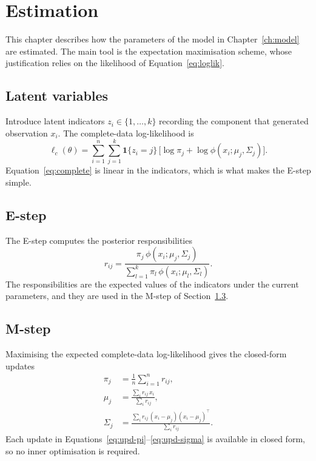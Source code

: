 \chapter{Estimation}\label{ch:estimation}

This chapter describes how the parameters of the model in
Chapter~\ref{ch:model} are estimated. The main tool is the expectation
maximisation scheme, whose justification relies on the likelihood of
Equation~\eqref{eq:loglik}.

\section{Latent variables}\label{sec:latent}

Introduce latent indicators $z_i \in \{1,\dots,k\}$ recording the component
that generated observation $x_i$. The complete-data log-likelihood is
\begin{equation}\label{eq:complete}
  \ell_c(\theta) = \sum_{i=1}^{n}\sum_{j=1}^{k} \mathbf{1}\{z_i=j\}\,
  \bigl[\log \pi_j + \log \phi(x_i;\mu_j,\Sigma_j)\bigr].
\end{equation}
Equation~\eqref{eq:complete} is linear in the indicators, which is what makes
the E-step simple.

\lipsum[19-20]

\section{E-step}\label{sec:estep}

The E-step computes the posterior responsibilities
\begin{equation}\label{eq:resp}
  r_{ij} = \frac{\pi_j\,\phi(x_i;\mu_j,\Sigma_j)}
  {\sum_{l=1}^{k}\pi_l\,\phi(x_i;\mu_l,\Sigma_l)} .
\end{equation}
The responsibilities are the expected values of the indicators under the
current parameters, and they are used in the M-step of Section~\ref{sec:mstep}.

\lipsum[21-22]

\section{M-step}\label{sec:mstep}

Maximising the expected complete-data log-likelihood gives the closed-form
updates
\begin{align}
  \pi_j &= \frac{1}{n}\sum_{i=1}^{n} r_{ij}, \label{eq:upd-pi}\\
  \mu_j &= \frac{\sum_i r_{ij}\,x_i}{\sum_i r_{ij}}, \label{eq:upd-mu}\\
  \Sigma_j &= \frac{\sum_i r_{ij}\,(x_i-\mu_j)(x_i-\mu_j)^\top}{\sum_i r_{ij}}.
  \label{eq:upd-sigma}
\end{align}
Each update in Equations~\eqref{eq:upd-pi}--\eqref{eq:upd-sigma} is available
in closed form, so no inner optimisation is required.

